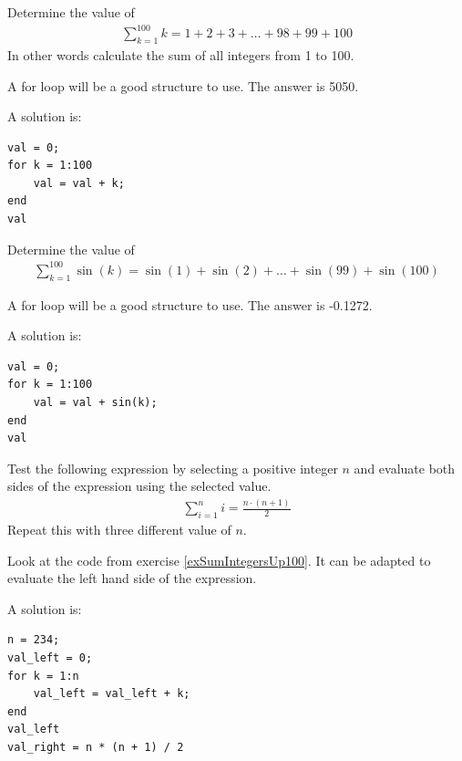 \begin{ex}\label{exSumIntegersUp100}%
Determine the value of 
\begin{align*}
\sum_{k = 1}^{100} k = 1 + 2 + 3 + \ldots + 98 + 99 + 100
\end{align*}
In other words calculate the sum of all integers from 1 to 100.
\begin{hint}
A for loop will be a good structure to use.
The answer is 5050.
\end{hint}
\begin{sol}
A solution is:
\begin{lstlisting}
val = 0;
for k = 1:100
    val = val + k;
end
val
\end{lstlisting}
\end{sol}
\end{ex}

\begin{ex}
Determine the value of 
\begin{align*}
\sum_{k = 1}^{100} \sin(k) = \sin(1) + \sin(2) + \ldots + \sin(99) + \sin(100)
\end{align*}
\begin{hint}
A for loop will be a good structure to use.
The answer is -0.1272.
\end{hint}
\begin{sol}
A solution is:
\begin{lstlisting}
val = 0;
for k = 1:100
    val = val + sin(k);
end
val
\end{lstlisting}
\end{sol}
\end{ex}


\begin{ex}
Test the following expression by selecting a positive integer $n$
and evaluate both sides of the expression using the selected value.
\begin{align*}
\sum_{i = 1}^n i = \frac{n \cdot (n + 1)}{2}
\end{align*}
Repeat this with three different value of $n$.
\begin{hint}
Look at the code from exercise \ref{exSumIntegersUp100}.
It can be adapted to evaluate the left hand side of the expression.
\end{hint}
\begin{sol}
A solution is:
\begin{lstlisting}
n = 234;
val_left = 0;
for k = 1:n
    val_left = val_left + k;
end
val_left
val_right = n * (n + 1) / 2
\end{lstlisting}
\end{sol}
\end{ex}


